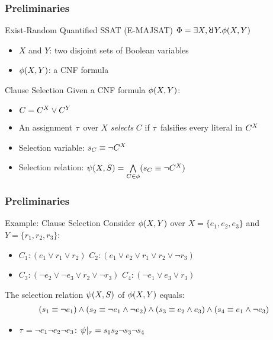 \begin{frame}
    \frametitle{Preliminaries}
    \begin{block}{Exist-Random Quantified SSAT (E-MAJSAT)}
        $\Qf=\exists X,\random{} Y.\pf(X,Y)$
        \pause
        \begin{itemize}
            \item $X$ and $Y$: two disjoint sets of Boolean variables
                  \pause
            \item $\phi(X,Y)$: a CNF formula
                  \pause
        \end{itemize}
    \end{block}
    \begin{block}{Clause Selection}
        Given a CNF formula $\phi(X,Y)$:
        \pause
        \begin{itemize}
            \item $C=C^X\lor C^Y$
                  \pause
            \item An assignment $\tau$ over $X$ \textit{selects} $C$ if $\tau$ falsifies every literal in $C^X$
                  \pause
            \item Selection variable: $s_{C}\equiv\lnot C^X$
                  \pause
            \item Selection relation: $\psi(X,S)=\bigwedge\limits_{C\in\phi}(s_{C}\equiv\lnot C^X)$
        \end{itemize}
    \end{block}
\end{frame}

\begin{frame}
    \frametitle{Preliminaries}
    \begin{block}{Example: Clause Selection}
        Consider $\phi(X,Y)$ over $X=\{e_1,e_2,e_3\}$ and $Y=\{r_1,r_2,r_3\}$:
        \begin{itemize}
            \item[] $C_1: (e_1 \lor r_1 \lor r_2)$ $C_2: (e_1 \lor e_2 \lor r_1 \lor r_2 \lor \lnot r_3)$
            \item[] $C_3: (\lnot e_2 \lor \lnot e_3 \lor r_2 \lor \lnot r_3)$ $C_4: (\lnot e_1 \lor e_3 \lor r_3)$
        \end{itemize}
        \pause
        The selection relation $\psi(X,S)$ of $\phi(X,Y)$ equals:
        \belowdisplayskip=0pt
        \begin{align*}
            (s_{1} \equiv \lnot e_1) \land
            (s_{2} \equiv \lnot e_1 \land \lnot e_2) \land
            (s_{3} \equiv e_2 \land e_3) \land
            (s_{4} \equiv e_1 \land \lnot e_3)
        \end{align*}
        \pause
        \begin{itemize}
            \item $\tau=\lnot e_1 \lnot e_2 \lnot e_3$: $\psi|_{\tau}=s_1s_2\neg s_3 \neg s_4$
        \end{itemize}
    \end{block}
\end{frame}